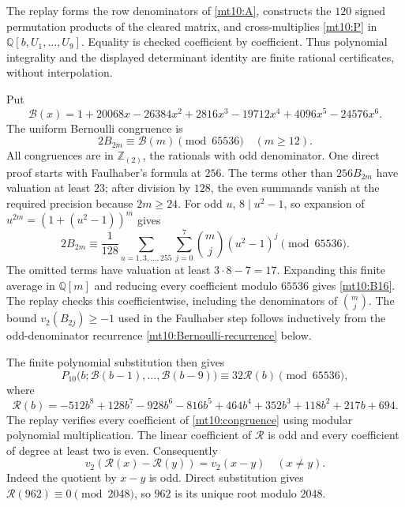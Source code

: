 The replay forms the row denominators of \eqref{mt10:A}, constructs
the $120$ signed permutation products of the cleared matrix, and
cross-multiplies \eqref{mt10:P} in
$\mathbb Q[b,U_1,\ldots,U_9]$. Equality is checked coefficient by
coefficient. Thus polynomial integrality and the displayed determinant
identity are finite rational certificates, without interpolation.

Put
\[
 \mathcal B(x)=1+20068x-26384x^2+2816x^3-19712x^4
                         +4096x^5-24576x^6.
\]
The uniform Bernoulli congruence is
\begin{equation}\label{mt10:B16}
           2B_{2m}\equiv\mathcal B(m)\pmod {65536}
                  \quad(m\ge12).
\end{equation}
All congruences are in $\mathbb Z_{(2)}$, the rationals with odd
denominator. One direct proof starts with Faulhaber's formula at
$256$. The terms other than $256B_{2m}$ have valuation at least
$23$; after division by $128$, the even summands vanish at the
required precision because $2m\ge24$. For odd $u$, $8\mid u^2-1$,
so expansion of $u^{2m}=(1+(u^2-1))^m$ gives
\[
 2B_{2m}\equiv\frac1{128}
       \sum_{u=1,3,\ldots,255}\sum_{j=0}^7
                    \binom mj(u^2-1)^j\pmod {65536}.
\]
The omitted terms have valuation at least $3\cdot8-7=17$.
Expanding this finite average in $\mathbb Q[m]$ and reducing every
coefficient modulo $65536$ gives \eqref{mt10:B16}. The replay
checks this coefficientwise, including the denominators of
$\binom mj$. The bound $v_2(B_{2j})\ge-1$ used in the Faulhaber
step follows inductively from the odd-denominator recurrence
\eqref{mt10:Bernoulli-recurrence} below.

The finite polynomial substitution then gives
\begin{equation}\label{mt10:congruence}
 P_{10}\bigl(b;\mathcal B(b-1),\ldots,\mathcal B(b-9)\bigr)
                  \equiv32\mathcal R(b)\pmod {65536},
\end{equation}
where
\[
 \mathcal R(b)=-512b^8+128b^7-928b^6-816b^5+464b^4
                         +352b^3+118b^2+217b+694.
\]
The replay verifies every coefficient of \eqref{mt10:congruence}
using modular polynomial multiplication. The linear coefficient of
$\mathcal R$ is odd and every coefficient of degree at least two
is even. Consequently
\[
 v_2(\mathcal R(x)-\mathcal R(y))=v_2(x-y)\quad(x\ne y).
\]
Indeed the quotient by $x-y$ is odd. Direct substitution gives
$\mathcal R(962)\equiv0\pmod {2048}$, so $962$ is its unique
root modulo $2048$.

